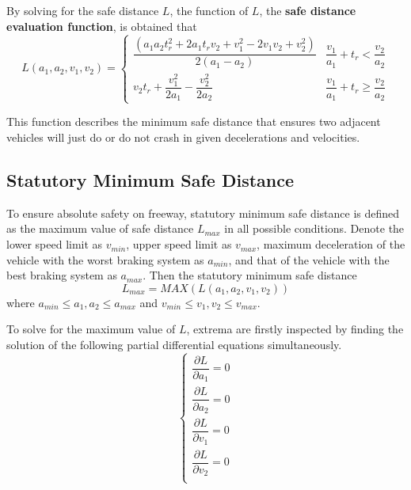 By solving for the safe distance $ L $, the function of 
$ L $, the \textbf{safe distance evaluation function}, is 
obtained that 
\begin{equation}
L(a_1, a_2, v_1, v_2) = 
\left \{
\begin{array}{cl}
\dfrac{(a_1a_2t_r^2 + 2a_1t_rv_2 + v_1^2 - 2v_1v_2 + 
v_2^2)}{2(a_1-a_2)} & 
\dfrac{v_1}{a_1} + t_r < \dfrac{v_2}{a_2}\\
v_2 t_r + \dfrac{v_1 ^ 2}{2a_1} -\dfrac{v_2^2}{2a_2} & 
\dfrac{v_1}{a_1} + t_r \geq \dfrac{v_2}{a_2}
\end{array}
\right .
\end{equation}

This function describes the minimum safe distance that 
ensures two adjacent vehicles will just do or do not 
crash in given decelerations and velocities.


\subsection{Statutory Minimum Safe Distance}

To ensure absolute safety on freeway, statutory minimum 
safe distance is defined as the maximum value of safe 
distance $ L_{max} $ in all possible conditions. Denote 
the lower speed limit as $ v_{min} $, upper speed limit as 
$ v_{max} $, maximum deceleration of the vehicle with the 
worst braking system as $ a_{min} $, and that of the 
vehicle with the best braking system as $ a_{max} $. Then 
the statutory minimum safe distance
\begin{equation}
L_{max} = MAX(L(a_1,a_2,v_1,v_2))
\end{equation}
where $ a_{min} \le a_1,a_2 \le a_{max} $ and $ v_{min} 
\le v_1,v_2 \le v_{max} $.

To solve for the maximum value of $ L $, extrema are 
firstly inspected by finding the solution of the following 
partial differential equations simultaneously.
\begin{displaymath}
\left \{
\begin{array}{cl}
\dfrac{\partial L}{\partial{a_1}} = 0 \\
\dfrac{\partial L}{\partial{a_2}} = 0 \\
\dfrac{\partial L}{\partial{v_1}} = 0 \\
\dfrac{\partial L}{\partial{v_2}} = 0 \\
\end{array}
\right .
\end{displaymath}

